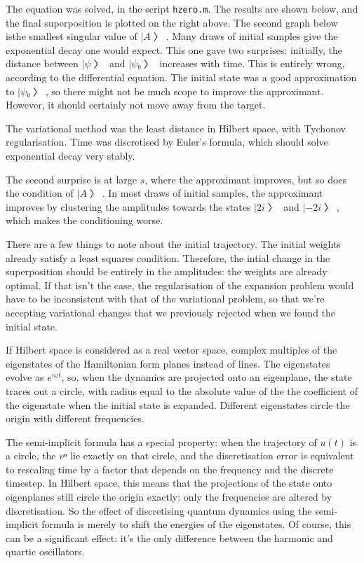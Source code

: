 The equation was solved, in the script {\tt hzero.m}.  The results are shown below, and the final superposition is plotted on the right above.  The second graph below isthe smallest singular value of $|A〉$.  Many draws of initial samples give the exponential decay one would expect.  This one gave two surprises: initially, the distance between $|ψ〉$ and $|ψ₀〉$ increases with time.  This is entirely wrong, according to the differential equation.  The initial state was a good approximation to $|ψ₀〉$, so there might not be much scope to improve the approximant.  However, it should certainly not move away from the target.

The variational method was the least distance in Hilbert space, with Tychonov regularisation.  Time was discretised by Euler's formula, which should solve exponential decay very stably.

The second surprise is at large $s$, where the approximant improves, but so does the condition of $|A〉$.  In most draws of initial samples, the approximant improves by clustering the amplitudes towards the states $|2i〉$ and $|-2i〉$, which makes the conditioning worse.


There are a few things to note about the initial trajectory.  The initial weights already satisfy a least squares condition.  Therefore, the intial change in the superposition should be entirely in the amplitudes: the weights are already optimal.  If that isn't the case, the regularisation of the expansion problem would have to be inconsistent with that of the variational problem, so that we're accepting variational changes that we previously rejected when we found the initial state.


If Hilbert space is considered as a real vector space, complex multiples of the eigenstates of the Hamiltonian form planes instead of lines.  The eigenstates evolve as $e^{iωt}$, so, when the dynamics are projected onto an eigenplane, the state traces out a circle, with radius equal to the absolute value of the the coefficient of the eigenstate when the initial state is expanded.  Different eigenstates circle the origin with different frequencies.

The semi-implicit formula has a special property: when the trajectory of $u(t)$ is a circle, the $vⁿ$ lie exactly on that circle, and the discretisation error is equivalent to rescaling time by a factor that depends on the frequency and the discrete timestep.  In Hilbert space, this means that the projections of the state onto eigenplanes still circle the origin exactly: only the frequencies are altered by discretisation.  So the effect of discretising quantum dynamics using the semi-implicit formula is merely to shift the energies of the eigenstates.  Of course, this can be a significant effect: it's the only difference between the harmonic and quartic oscillators.

